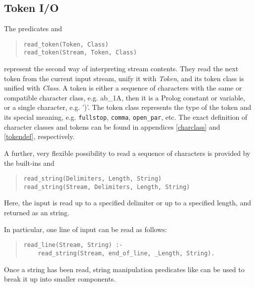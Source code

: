 \subsection{Token I/O}
The predicates
 and
\begin{quote}\begin{verbatim}
read_token(Token, Class)
read_token(Stream, Token, Class)
\end{verbatim}\end{quote}
represent the second way of interpreting stream contents.
They read the next token from the current
input stream, unify it with {\it Token},
and its token class is unified with {\it Class}.
A token is either a sequence of characters with the same or compatible
character class, e.g. ab_1A, then it is a Prolog constant
or variable, or a single character, e.g. ')'.
The token class represents the type of the token and
its special meaning, e.g. {\tt fullstop}, {\tt comma}, {\tt open_par}, etc.
The exact definition of character classes and tokens can be found in
appendices \ref{charclass} and \ref{tokendef}, respectively.

A further, very flexible possibility to read a sequence of
characters is provided by the built-ins
 and
\begin{quote}\begin{verbatim}
read_string(Delimiters, Length, String)
read_string(Stream, Delimiters, Length, String)
\end{verbatim}\end{quote}
Here, the input is read up to a specified delimiter or up to a specified
length, and returned as an {\eclipse} string.

In particular, one line of input can be read as follows:
\begin{quote}\begin{verbatim}
read_line(Stream, String) :-
    read_string(Stream, end_of_line, _Length, String).
\end{verbatim}\end{quote}
Once a string has been read, string manipulation predicates like
can be used to break it up into smaller components.


